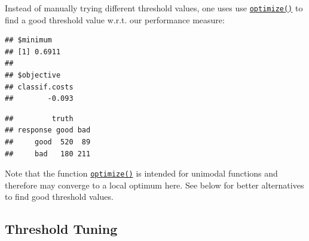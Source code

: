 \documentclass[
]{scrbook}
\newenvironment{Shaded}{\begin{snugshade}}{\end{snugshade}}
\newcommand{\CommentTok}[1]{\textcolor[rgb]{0.56,0.35,0.01}{\textit{#1}}}
\newcommand{\ControlFlowTok}[1]{\textcolor[rgb]{0.13,0.29,0.53}{\textbf{#1}}}
\newcommand{\DecValTok}[1]{\textcolor[rgb]{0.00,0.00,0.81}{#1}}
\newcommand{\FloatTok}[1]{\textcolor[rgb]{0.00,0.00,0.81}{#1}}
\newcommand{\FunctionTok}[1]{\textcolor[rgb]{0.00,0.00,0.00}{#1}}
\newcommand{\NormalTok}[1]{#1}
\newcommand{\OtherTok}[1]{\textcolor[rgb]{0.56,0.35,0.01}{#1}}
\newcommand{\SpecialCharTok}[1]{\textcolor[rgb]{0.00,0.00,0.00}{#1}}
\renewenvironment{Shaded} {\begin{snugshade}\small} {\end{snugshade}}
\begin{document}
Instead of manually trying different threshold values, one uses use \href{https://www.rdocumentation.org/packages/stats/topics/optimize}{\texttt{optimize()}} to find a good threshold value w.r.t. our performance measure:

\begin{Shaded}
\end{Shaded}

\begin{verbatim}
## $minimum
## [1] 0.6911
## 
## $objective
## classif.costs 
##        -0.093
\end{verbatim}

\begin{Shaded}
\end{Shaded}

\begin{verbatim}
##         truth
## response good bad
##     good  520  89
##     bad   180 211
\end{verbatim}

Note that the function \href{https://www.rdocumentation.org/packages/stats/topics/optimize}{\texttt{optimize()}} is intended for unimodal functions and therefore may converge to a local optimum here.
See below for better alternatives to find good threshold values.

\hypertarget{threshold-tuning-1}{%
\subsection{Threshold Tuning}\label{threshold-tuning-1}}
\end{document}
